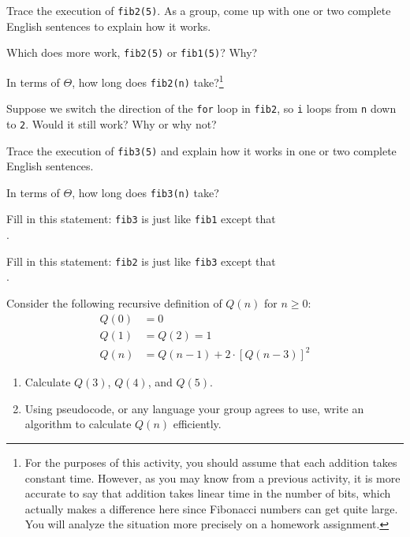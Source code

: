 \documentclass{tufte-handout}
\begin{document}
\begin{questions}
\item Trace the execution of \verb|fib2(5)|. As a group, come up with
  one or two complete English sentences to explain how it
  works. \vspace{1in}
\item Which does more work, \verb|fib2(5)| or \verb|fib1(5)|?  Why?
\item In terms of $\Theta$, how long does \verb|fib2(n)|
  take?\footnote{For the purposes of this activity, you should assume
    that each addition takes constant time.  However, as you may know from
    a previous activity, it is more accurate to say that addition
    takes linear time in the number of bits, which actually makes a
    difference here since Fibonacci numbers can get quite large.  You
    will analyze the situation more precisely on a homework assignment.}
\item Suppose we switch the direction of the \verb|for| loop in
  \verb|fib2|, so \verb|i| loops from \verb|n| down to \verb|2|.
  Would it still work?  Why or why not?
\item Trace the execution of \verb|fib3(5)| and explain how it works
  in one or two complete English sentences. \vspace{1in}
\item In terms of $\Theta$, how long does \verb|fib3(n)| take?
\item Fill in this statement: \verb|fib3| is just like \verb|fib1|
  except that \\ \blank.
\item Fill in this statement: \verb|fib2| is just like \verb|fib3|
  except that \\ \blank.
\item Consider the following recursive definition of $Q(n)$ for $n
  \geq 0$:
  \begin{align*}
    Q(0) &= 0 \\
    Q(1) &= Q(2) = 1 \\
    Q(n) &= Q(n-1) + 2 \cdot \left[Q(n - 3)\right]^2
  \end{align*}
  \begin{enumerate}[label=(\alph*)]
  \item Calculate $Q(3)$, $Q(4)$, and $Q(5)$. \vspace{1in}
  \item Using pseudocode, or any language your group agrees to use, write an
    algorithm to calculate $Q(n)$ efficiently.
  \end{enumerate}
\end{questions}
\end{document}
